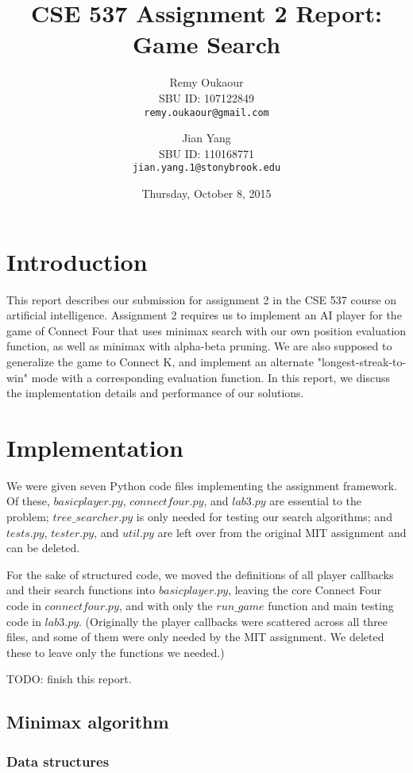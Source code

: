 \documentclass[11pt]{article}
\title{CSE 537 Assignment 2 Report: Game Search}
\author{
Remy Oukaour \\
	{\small SBU ID: 107122849}\\
	{\small \texttt{remy.oukaour@gmail.com}}
\and
Jian Yang \\
	{\small SBU ID: 110168771}\\
	{\small \texttt{jian.yang.1@stonybrook.edu}}
}
\date{Thursday, October 8, 2015}
\begin{document}
\maketitle

\section{Introduction}

This report describes our submission for assignment 2 in the CSE 537 course on
artificial intelligence. Assignment 2 requires us to implement an AI player
for the game of Connect Four that uses minimax search with our own position
evaluation function, as well as minimax with alpha-beta pruning. We are also
supposed to generalize the game to Connect K, and implement an alternate
"longest-streak-to-win" mode with a corresponding evaluation function.
In this report, we discuss the implementation details and performance of
our solutions.

\section{Implementation}

We were given seven Python code files implementing the assignment framework.
Of these, \(basicplayer.py\), \(connectfour.py\), and \(lab3.py\) are essential
to the problem; \(tree\_searcher.py\) is only needed for testing our search
algorithms; and \(tests.py\), \(tester.py\), and \(util.py\) are left over
from the original MIT assignment and can be deleted.

For the sake of structured code, we moved the definitions of all player
callbacks and their search functions into \(basicplayer.py\), leaving the core
Connect Four code in \(connectfour.py\), and with only the \(run\_game\)
function and main testing code in \(lab3.py\). (Originally the player callbacks
were scattered across all three files, and some of them were only needed by
the MIT assignment. We deleted these to leave only the functions we needed.)

TODO: finish this report.

\subsection{Minimax algorithm}

\subsubsection{Data structures}
\end{document}
